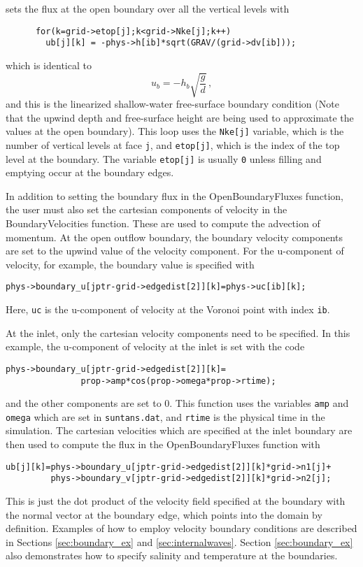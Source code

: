 sets the flux at the open boundary over all the vertical levels with
\begin{verbatim}
      for(k=grid->etop[j];k<grid->Nke[j];k++) 
        ub[j][k] = -phys->h[ib]*sqrt(GRAV/(grid->dv[ib]));
\end{verbatim}
which is identical to 
\[ u_b = -h_b\sqrt{\frac{g}{d}} \,,\]
and this is the linearized shallow-water free-surface boundary condition (Note that the upwind depth
and free-surface height are being used to approximate the values at the open boundary).  This loop uses
the \verb+Nke[j]+ variable, which is the number of vertical levels at face \verb+j+,
and \verb+etop[j]+, which is the index of the top level at the boundary.  The variable
\verb+etop[j]+ is usually \verb+0+ unless filling and emptying occur at the boundary
edges.  

In addition to setting
the boundary flux in the OpenBoundaryFluxes function, the user must also set the cartesian components
of velocity in the BoundaryVelocities function.  These are used to compute the advection of momentum.
At the open outflow boundary, the boundary velocity components are set to the upwind value of the velocity
component.  For the u-component of velocity, for example, the boundary value is specified
with
\begin{verbatim}
phys->boundary_u[jptr-grid->edgedist[2]][k]=phys->uc[ib][k];
\end{verbatim}
Here, \verb+uc+ is the u-component of velocity at the Voronoi point with index \verb+ib+.

At the inlet, only the cartesian velocity components need to be specified.  In this example,
the u-component of velocity at the inlet is set with the code
\begin{verbatim}
phys->boundary_u[jptr-grid->edgedist[2]][k]=
               prop->amp*cos(prop->omega*prop->rtime);
\end{verbatim}
and the other components are set to 0.  This function uses the variables \verb+amp+ and \verb+omega+
which are set in \verb+suntans.dat+, and \verb+rtime+ is the physical time in the simulation.
The cartesian velocities which are specified at the inlet boundary are then used to compute
the flux in the OpenBoundaryFluxes function with
\begin{verbatim}
ub[j][k]=phys->boundary_u[jptr-grid->edgedist[2]][k]*grid->n1[j]+
         phys->boundary_v[jptr-grid->edgedist[2]][k]*grid->n2[j];
\end{verbatim}
This is just the dot product of the velocity field specified at the boundary with the
normal vector at the boundary edge, which points into the domain by definition.
Examples of how to employ velocity boundary conditions are described in Sections \ref{sec:boundary_ex}
and \ref{sec:internalwaves}.  Section \ref{sec:boundary_ex} also demonstrates 
how to specify salinity and temperature at the boundaries.
